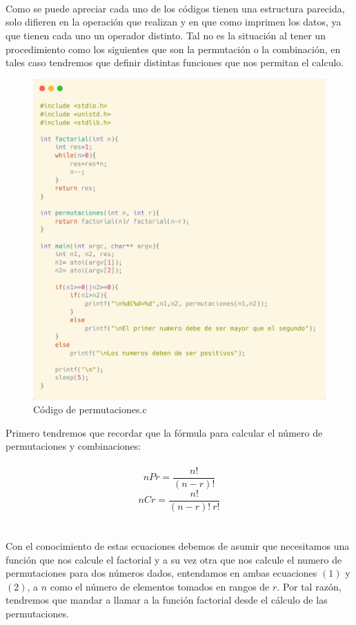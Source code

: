 \documentclass[10pt]{article}
\begin{document}
	\\\\\\
	Como se puede apreciar cada uno de los códigos tienen una estructura parecida, solo difieren en la operación que realizan y en que como imprimen los datos, ya que tienen cada uno un operador distinto. Tal no es la situación al tener un procedimiento como los siguientes que son la permutación o la combinación, en tales caso tendremos que definir distintas funciones que nos permitan el calculo. 
	\begin{figure}[h!]
		\centering
		\includegraphics[width=0.7\linewidth]{permutaciones.png}
		\caption{Código de permutaciones.c}
		\label{fig:permutaciones}
	\end{figure}
	\newpage
	Primero tendremos que recordar que la fórmula para calcular el número de permutaciones y combinaciones:  
	\\\\
	\begin{equation}
		nPr=\frac{n!}{(n-r)!}
	\end{equation}
	\begin{equation}
		nCr=\frac{n!}{(n-r)!\ r!}
	\end{equation}
	\\\\
	Con el conocimiento de estas ecuaciones debemos de asumir que necesitamos una función que nos calcule el factorial y a su vez otra que nos calcule el numero de permutaciones para dos números dados, entendamos en ambas ecuaciones $(1)$ y $(2)$, a $n$ como el número de elementos tomados en rangos de $r$. Por tal razón, tendremos que mandar a llamar a la función factorial desde el cálculo de las permutaciones. 
\end{document}
